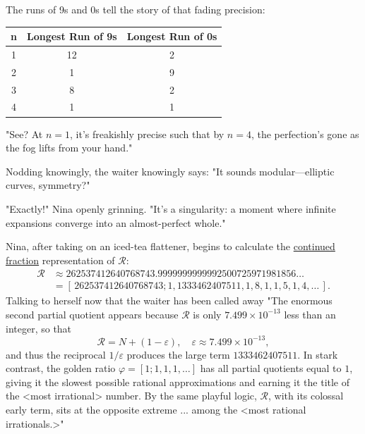 The runs of 9s and 0s tell the story of that fading precision:
\vspace{0.3cm}

\begin{tabular}{|c|c|c|}
\hline
\textbf{n} & \textbf{Longest Run of 9s} & \textbf{Longest Run of 0s} \\
\hline
1 & 12 & 2 \\
2 & 1 & 9 \\
3 & 8 & 2 \\
4 & 1 & 1 \\
\hline
\end{tabular}
\vspace{0.3cm}

"See? At \(n=1\), it’s freakishly precise such that by \(n=4\), the perfection’s gone as the fog lifts from your hand."

Nodding knowingly, the waiter knowingly says: "It sounds modular—elliptic curves, symmetry?"

"Exactly!" Nina openly grinning. "It’s a singularity: a moment where infinite expansions converge into an almost-perfect whole."


Nina, after taking on an iced-tea flattener, begins to calculate the \href{https://colab.research.google.com/drive/1gHUha6vLc_Mg0x224fmExqYGg0-iLQwP?usp=sharing}{continued fraction} representation of $\mathcal{R}$:
\begin{align*}
\mathcal{R} &\approx 262537412640768743.9999999999992500725971981856\ldots\\
&= [\,262537412640768743; 1, 1333462407511, 1, 8, 1, 1, 5, 1, 4, \dots\,].
\end{align*}
Talking to herself now that the waiter has been called away "The enormous second partial quotient appears because $\mathcal{R}$ is only $7.499\times 10^{-13}$ less than an integer, so that
\[
\mathcal{R} = N + (1 - \varepsilon), \quad \varepsilon \approx 7.499\times 10^{-13},
\]
and thus the reciprocal $1/\varepsilon$ produces the large term $1333462407511$. In stark contrast, the golden ratio $\varphi = [1;1,1,1,\dots]$ has all partial quotients equal to $1$, giving it the slowest possible rational approximations and earning it the title of the <most irrational> number. By the same playful logic, $\mathcal{R}$, with its colossal early term, sits at the opposite extreme ... among the <most rational irrationals.>"

